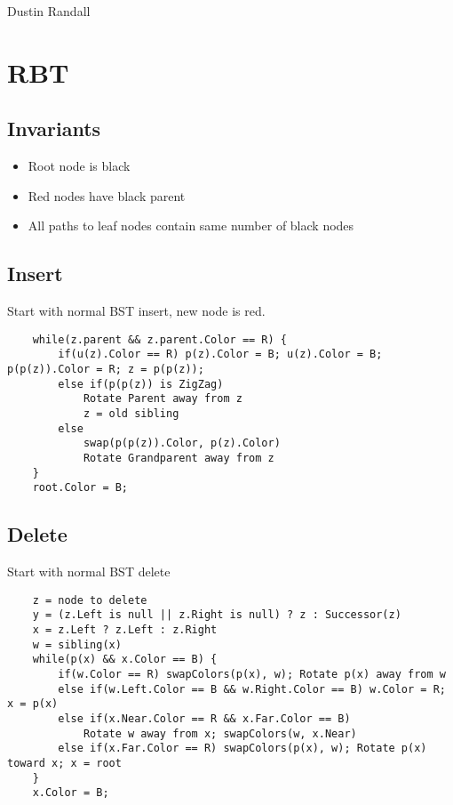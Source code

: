 \documentclass{article}
\begin{document}
Dustin Randall \\

\section{RBT}
\subsection{Invariants}
\begin{itemize}
    \item Root node is black
    \item Red nodes have black parent
    \item All paths to leaf nodes contain same number of black nodes
\end{itemize}
\subsection{Insert}
Start with normal BST insert, new node is red.
\begin{lstlisting}
    while(z.parent && z.parent.Color == R) {
        if(u(z).Color == R) p(z).Color = B; u(z).Color = B; p(p(z)).Color = R; z = p(p(z));
        else if(p(p(z)) is ZigZag)
            Rotate Parent away from z
            z = old sibling
        else
            swap(p(p(z)).Color, p(z).Color)
            Rotate Grandparent away from z
    }
    root.Color = B;
\end{lstlisting}

\subsection{Delete}
Start with normal BST delete
\begin{lstlisting}
    z = node to delete
    y = (z.Left is null || z.Right is null) ? z : Successor(z)
    x = z.Left ? z.Left : z.Right
    w = sibling(x)
    while(p(x) && x.Color == B) {
        if(w.Color == R) swapColors(p(x), w); Rotate p(x) away from w
        else if(w.Left.Color == B && w.Right.Color == B) w.Color = R; x = p(x)
        else if(x.Near.Color == R && x.Far.Color == B) 
            Rotate w away from x; swapColors(w, x.Near)
        else if(x.Far.Color == R) swapColors(p(x), w); Rotate p(x) toward x; x = root
    }
    x.Color = B;
\end{lstlisting}
\end{document}
